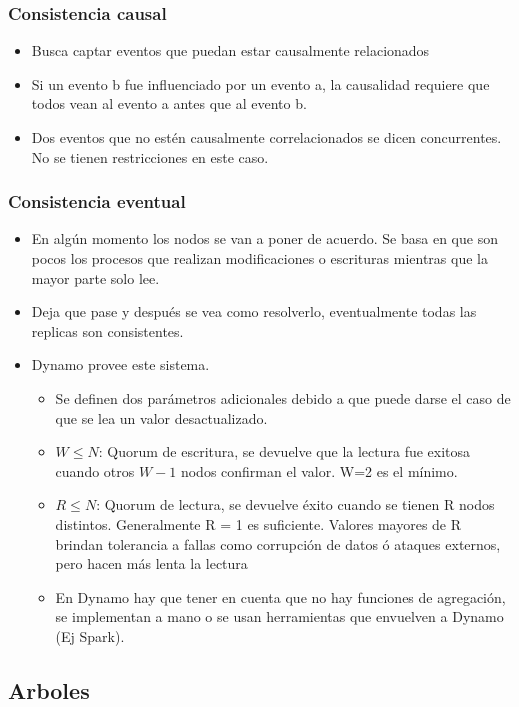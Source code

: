 \subsubsection*{Consistencia causal}

\begin{itemize}
\item Busca captar eventos que puedan estar causalmente relacionados
\item Si un evento b fue influenciado por un evento a, la causalidad requiere que todos vean al evento a antes que al evento b.
\item Dos eventos que no estén causalmente correlacionados se dicen concurrentes. No se tienen restricciones en este caso.
\end{itemize}

\subsubsection*{Consistencia eventual}

\begin{itemize}
\item En algún momento los nodos se van a poner de acuerdo. Se basa en que son pocos los procesos que realizan modificaciones o escrituras mientras que la mayor parte solo lee.
\item Deja que pase y después se vea como resolverlo, eventualmente todas las replicas son consistentes.
\item Dynamo provee este sistema. 
\begin{itemize}
\item Se definen dos parámetros adicionales debido a que puede darse el caso de que se lea un valor desactualizado.
\item $W \leq N$: Quorum de escritura, se devuelve que la lectura fue exitosa cuando otros $W-1$ nodos confirman el valor. W=2 es el mínimo.
\item $R \leq N$: Quorum de lectura, se devuelve éxito cuando se tienen R nodos distintos. Generalmente R = 1 es suficiente. Valores mayores de R brindan tolerancia a fallas como corrupción de datos ó ataques externos, pero hacen más lenta la lectura
\item En Dynamo hay que tener en cuenta que no hay funciones de agregación, se implementan a mano o se usan herramientas que envuelven a Dynamo (Ej Spark).
\end{itemize}
\end{itemize}

\subsection*{Arboles}
